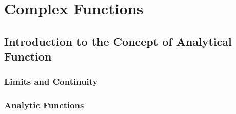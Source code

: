 \chapter{Complex Functions}

\section{Introduction to the Concept of Analytical Function}

\subsection{Limits and Continuity}

\subsection{Analytic Functions}

